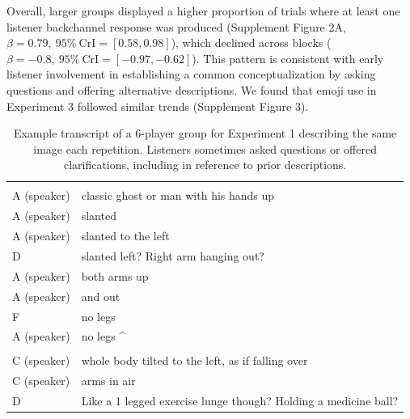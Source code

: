 \documentclass[
  english,
]{article}
\begin{document}
Overall, larger groups displayed a higher proportion of trials where at least one listener backchannel response was produced (Supplement Figure 2A, \(\beta=0.79,\:95\%\:\mathrm{CrI}=[0.58, 0.98]\)), which declined across blocks (\(\beta=-0.8,\:95\%\:\mathrm{CrI}=[-0.97, -0.62]\)).
This pattern is consistent with early listener involvement in establishing a common conceptualization by asking questions and offering alternative descriptions.
We found that emoji use in Experiment 3 followed similar trends (Supplement Figure 3).

\begin{table}[H]

\caption{\label{tab:listener-example}Example transcript of a 6-player group for Experiment 1 describing the same image each repetition. Listeners sometimes asked questions or offered clarifications, including in reference to prior descriptions.}
\centering
\begin{tabu} to 
\toprule
\addlinespace[0.3em]
\\
\hspace{1em}A (speaker) & classic ghost or man with his hands up\\
\hspace{1em}A (speaker) & slanted\\
\hspace{1em}A (speaker) & slanted to the left\\
\hspace{1em}D & slanted left? Right arm hanging out?\\
\hspace{1em}A (speaker) & both arms up\\
\hspace{1em}A (speaker) & and out\\
\hspace{1em}F & no \vphantom{1} legs\\
\hspace{1em}A (speaker) & no legs \textasciicircum{}\\
\addlinespace[0.3em]
\\
\hspace{1em}C (speaker) & whole body tilted to the left, as if falling over\\
\hspace{1em}C (speaker) & arms in air\\
\hspace{1em}D & Like a 1 legged exercise lunge though? Holding a medicine ball?\\

\end{tabu}
\end{table}
\end{document}
